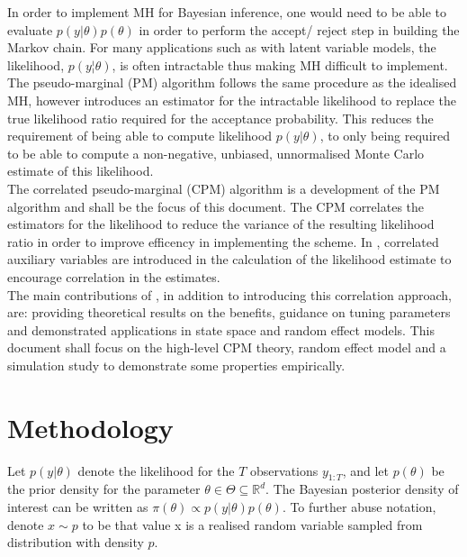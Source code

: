 \documentclass{article}
\begin{document}
In order to implement MH for Bayesian inference, one would need to be able to evaluate $p(y|\theta) p(\theta)$ in order to perform the accept/ reject step in building the Markov chain. For many applications such as with latent variable models, the likelihood, $ p(y ¦ \theta)$, is often intractable thus making MH difficult to implement. \\

The pseudo-marginal (PM) algorithm follows the same procedure as the idealised MH, however introduces an estimator for the intractable likelihood to replace the true likelihood ratio required for the acceptance probability. This reduces the requirement of being able to compute likelihood $p(y|\theta)$, to only being required to be able to compute a non-negative, unbiased, unnormalised Monte Carlo estimate of this likelihood. \\

The correlated pseudo-marginal (CPM) algorithm is a development of the PM algorithm and shall be the focus of this document. The CPM correlates the estimators for the likelihood to reduce the variance of the resulting likelihood ratio in order to improve efficency in implementing the scheme. In \cite{cpmmDeligiannidis2015}, correlated auxiliary variables are introduced in the calculation of the likelihood estimate to encourage correlation in the estimates.\\

The main contributions of \cite{cpmmDeligiannidis2015}, in addition to introducing this correlation approach, are: providing theoretical results on the benefits, guidance on tuning parameters and demonstrated applications in state space and random effect models. This document shall focus on the high-level CPM theory, random effect model and a simulation study to demonstrate some properties empirically.

\section{Methodology}
Let $p(y|\theta)$ denote the likelihood for the $T$ observations $y_{1:T}$, and let $p(\theta)$ be the prior density for the parameter $\theta \in \Theta \subseteq \mathbb{R}^{d}$. The Bayesian posterior density of interest can be written as $\pi (\theta) \propto p(y|\theta) p(\theta)$. To further abuse notation, denote $x \sim p$ to be that value x is a realised random variable sampled from distribution with density $p$.\\
\end{document}
